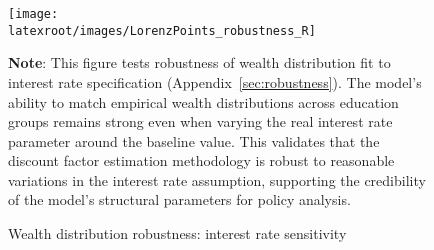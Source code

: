 \documentclass{econsocart}
\begin{document}
\begin{figure}[htb] 
  \centering
  \caption{Wealth distribution robustness: interest rate sensitivity}
  \label{fig:LorenzPts_robustness_R} 
  \texttt{[image: \\latexroot/images/LorenzPoints\_robustness\_R]}

  \medskip
  \noindent\parbox{\textwidth}{\footnotesize
    \textbf{Note}: This figure tests robustness of wealth distribution fit to interest rate specification
    (Appendix~\ref{sec:robustness}).
    The model's ability to match empirical wealth distributions across education groups
    remains strong even when varying the real interest rate parameter around the baseline value.
    This validates that the discount factor estimation methodology is robust to reasonable
    variations in the interest rate assumption, supporting the credibility of the model's
    structural parameters for policy analysis.
  }
\end{figure}
\end{document}
